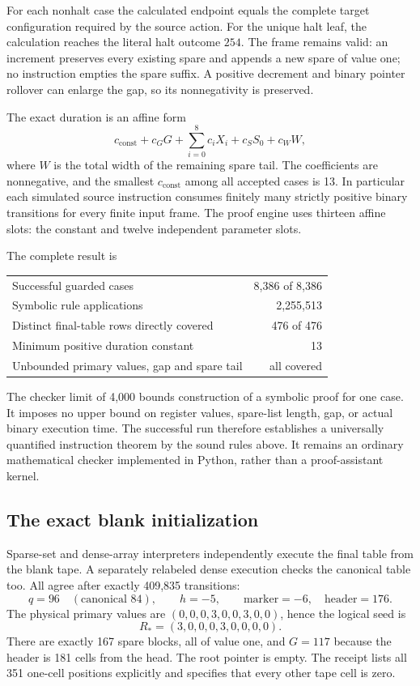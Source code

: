 For each nonhalt case the calculated endpoint equals the complete target
configuration required by the source action. For the unique halt leaf,
the calculation reaches the literal halt outcome $254$. The frame
remains valid: an increment preserves every existing spare and appends
a new spare of value one; no instruction empties the spare suffix.
A positive decrement and binary pointer rollover can enlarge the gap,
so its nonnegativity is preserved.

The exact duration is an affine form
\[
 c_{\mathrm{const}}+c_GG+\sum_{i=0}^{8}c_iX_i+c_SS_0+c_WW,
\]
where $W$ is the total width of the remaining spare tail. The coefficients
are nonnegative, and the smallest $c_{\mathrm{const}}$ among all accepted cases is 13.
In particular each simulated source instruction consumes finitely many
strictly positive binary transitions for every finite input frame.
The proof engine uses thirteen affine slots: the constant and twelve
independent parameter slots.

The complete result is
\begin{center}
\begin{tabular}{lr}
\toprule
Successful guarded cases&8,386 of 8,386\\
Symbolic rule applications&2,255,513\\
Distinct final-table rows directly covered&476 of 476\\
Minimum positive duration constant&13\\
Unbounded primary values, gap and spare tail&all covered\\
\bottomrule
\end{tabular}
\end{center}

The checker limit of 4,000 bounds construction of a symbolic proof for
one case. It imposes no upper bound on register values, spare-list length,
gap, or actual binary execution time. The successful run therefore
establishes a universally quantified instruction theorem by the sound
rules above. It remains an ordinary mathematical checker implemented in
Python, rather than a proof-assistant kernel.

\subsection{The exact blank initialization}

Sparse-set and dense-array interpreters independently execute the final
table from the blank tape. A separately relabeled dense execution checks
the canonical table too. All agree after exactly 409,835 transitions:
\[
 q=96\quad(\text{canonical }84),\qquad h=-5,\qquad
 \text{marker}=-6,\quad\text{header}=176.
\]
The physical primary values are
$(0,0,0,3,0,0,3,0,0)$, hence the logical seed is
\[
                         R_*=(3,0,0,0,3,0,0,0,0).
\]
There are exactly 167 spare blocks, all of value one, and $G=117$ because
the header is 181 cells from the head. The root pointer is empty. The
receipt lists all 351 one-cell positions explicitly and specifies that
every other tape cell is zero.

